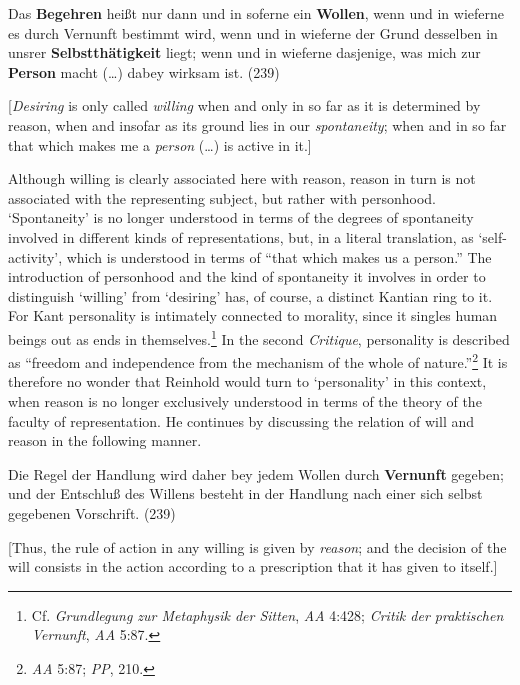 Das \textbf{Begehren} hei\ss{}t nur dann und in soferne ein \textbf{Wollen}, wenn und in wieferne es durch Vernunft bestimmt wird, wenn und in wieferne der Grund desselben in unsrer \textbf{Selbstth\"{a}tigkeit} liegt; wenn und in wieferne dasjenige, was mich zur \textbf{Person} macht (\ldots ) dabey wirksam ist. (239)

[\textit{Desiring} is only called \textit{willing} when and only in so far as it is determined by reason, when and insofar as its ground lies in our \textit{spontaneity}; when and in so far that which makes me a \textit{person} (\ldots ) is active in it.] 

Although willing is clearly associated here with reason, reason in turn is not associated with the representing subject, but rather with personhood. `Spontaneity' is no longer understood in terms of the degrees of spontaneity involved in different kinds of representations, but, in a literal translation, as `self{-}activity', which is understood in terms of ``that which makes us a person.'' The introduction of personhood and the kind of spontaneity it involves in order to distinguish `willing' from `desiring' has, of course, a distinct Kantian ring to it. For Kant personality is intimately connected to morality, since it singles human beings out as ends in themselves.\footnote{ Cf. \textit{Grundlegung zur Metaphysik der Sitten}, \textit{AA }4:428;\textit{ Critik der praktischen Vernunft}, \textit{AA }5:87.} In the second \textit{Critique}, personality is described as ``freedom and independence from the mechanism of the whole of nature.''\footnote{ \textit{AA }5:87; \textit{PP}, 210. } It is therefore no wonder that Reinhold would turn to `personality' in this context, when reason is no longer exclusively understood in terms of the theory of the faculty of representation. He continues by discussing the relation of will and reason in the following manner. 

Die Regel der Handlung wird daher bey jedem Wollen durch \textbf{Vernunft} gegeben; und der Entschlu\ss{} des Willens besteht in der Handlung nach einer sich selbst gegebenen Vorschrift. (239)

[Thus, the rule of action in any willing is given by \textit{reason}; and the decision of the will consists in the action according to a prescription that it has given to itself.] 

